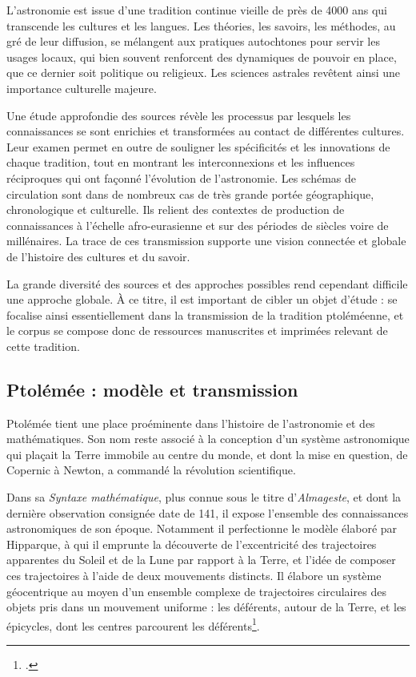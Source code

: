 
L'astronomie est issue d'une tradition continue vieille de près de 4000
ans qui transcende les cultures et les langues. Les théories, les
savoirs, les méthodes, au gré de leur diffusion, se mélangent aux
pratiques autochtones pour servir les usages locaux, qui bien souvent
renforcent des dynamiques de pouvoir en place, que ce dernier soit
politique ou religieux. Les sciences astrales revêtent ainsi une
importance culturelle majeure.

Une étude approfondie des sources révèle les processus par lesquels les
connaissances se sont enrichies et transformées au contact de
différentes cultures. Leur examen permet en outre de souligner les
spécificités et les innovations de chaque tradition, tout en montrant
les interconnexions et les influences réciproques qui ont façonné
l'évolution de l'astronomie. Les schémas de circulation sont dans de
nombreux cas de très grande portée géographique, chronologique et
culturelle. Ils relient des contextes de production de connaissances à
l'échelle afro-eurasienne et sur des périodes de siècles voire de
millénaires. La trace de ces transmission supporte une vision connectée
et globale de l'histoire des cultures et du savoir.

La grande diversité des sources et des approches possibles rend
cependant difficile une approche globale. À ce titre, il est important
de cibler un objet d'étude : \eida se focalise ainsi essentiellement dans
la transmission de la tradition ptoléméenne, et le corpus se compose
donc de ressources manuscrites et imprimées relevant de cette tradition.

\hypertarget{ptolemee-modele-et-transmission}{%
\subsection{Ptolémée : modèle et
transmission}\label{ptolemee-modele-et-transmission}}

Ptolémée tient une place proéminente dans l'histoire de l'astronomie et
des mathématiques. Son nom reste associé à la conception d'un système
astronomique qui plaçait la Terre immobile au centre du monde, et dont
la mise en question, de Copernic à Newton, a commandé la révolution
scientifique.

Dans sa \emph{Syntaxe mathématique}, plus connue sous le titre
d'\emph{Almageste}, et dont la dernière observation consignée date de
141, il expose l'ensemble des connaissances astronomiques de son époque.
Notamment il perfectionne le modèle élaboré par Hipparque, à qui il
emprunte la découverte de l'excentricité des trajectoires apparentes du
Soleil et de la Lune par rapport à la Terre, et l'idée de composer ces
trajectoires à l'aide de deux mouvements distincts. Il élabore un
système géocentrique au moyen d'un ensemble complexe de trajectoires
circulaires des objets pris dans un mouvement uniforme : les déférents,
autour de la Terre, et les épicycles, dont les centres parcourent les
déférents\footcite{lequeux_systeme_nodate}.


